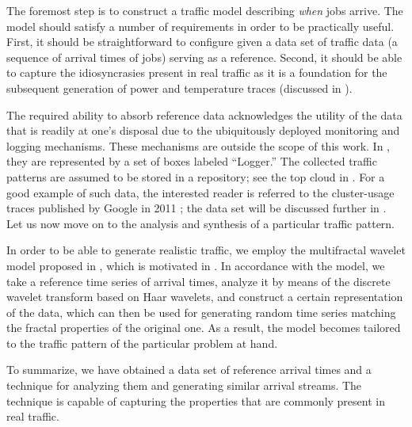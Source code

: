 The foremost step is to construct a traffic model describing \emph{when} jobs
arrive. The model should satisfy a number of requirements in order to be
practically useful. First, it should be straightforward to configure given a
data set of traffic data (a sequence of arrival times of jobs) serving as a
reference. Second, it should be able to capture the idiosyncrasies present in
real traffic as it is a foundation for the subsequent generation of power and
temperature traces (discussed in ).

The required ability to absorb reference data acknowledges the utility of the
data that is readily at one's disposal due to the ubiquitously deployed
monitoring and logging mechanisms. These mechanisms are outside the scope of
this work. In , they are represented by a set of boxes labeled
``Logger.'' The collected traffic patterns are assumed to be stored in a
repository; see the top cloud in . For a good example of such
data, the interested reader is referred to the cluster-usage traces published by
Google in 2011 \cite{google}; the data set will be discussed further in
. Let us now move on to the analysis and synthesis of a particular
traffic pattern.

In order to be able to generate realistic traffic, we employ the multifractal
wavelet model proposed in \cite{riedi1999}, which is motivated in
. In accordance with the model, we take a reference time series
of arrival times, analyze it by means of the discrete wavelet transform based on
Haar wavelets, and construct a certain representation of the data, which can
then be used for generating random time series matching the fractal properties
of the original one. As a result, the model becomes tailored to the traffic
pattern of the particular problem at hand.

To summarize, we have obtained a data set of reference arrival times and a
technique for analyzing them and generating similar arrival streams. The
technique is capable of capturing the properties that are commonly present in
real traffic.
